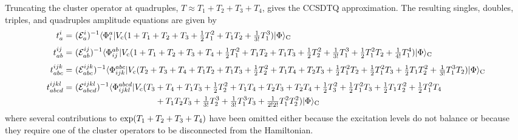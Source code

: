 \documentclass[11pt]{article}
\numberwithin{equation}{section}
\begin{document}
\begin{ex}
Truncating the cluster operator at quadruples, $T\approx T_1 + T_2 + T_3 + T_4$, gives the CCSDTQ approximation.
The resulting singles, doubles, triples, and quadruples amplitude equations are given by\begin{align}
\nonumber
  t_a^i
=&\
  (\mc{E}_a^i)^{-1}
  \ip{\F_i^a|
    V_\mr{c}
    (
      1
    +
      T_1
    +
      T_2
    +
      T_3
    +
      \tfr{1}{2}
      T_1^2
    +
      T_1T_2
    +
      \tfr{1}{3!}
      T_1^3
    )
  |\F}_\mr{C}
\\[3pt]
\nonumber
  t_{ab}^{ij}
=&\
  (\mc{E}_{ab}^{ij})^{-1}
  \br{\F_{ij}^{ab}}
    V_\mr{c}
    (
      1
    +
      T_1
    +
      T_2
    +
      T_3
    +
      T_4
    +
      \tfr{1}{2}
      T_1^2
    +
      T_1T_2
    +
      T_1T_3
    +
      \tfr{1}{2}
      T_2^2
    +
      \tfr{1}{3!}
      T_1^3
    +
      \tfr{1}{2}
      T_1^2T_2
    +
      \tfr{1}{4!}
      T_1^4
    )
  \kt{\F}_\mr{C}
\\[3pt]
\nonumber
  t_{abc}^{ijk}
=&\
  (\mc{E}_{abc}^{ijk})^{-1}
  \br{\F_{ijk}^{abc}}
    V_\mr{c}
    (
      T_2
    +
      T_3
    +
      T_4
    +
      T_1T_2
    +
      T_1T_3
    +
      \tfr{1}{2}
      T_2^2
    +
      T_1T_4
    +
      T_2T_3
    +
      \tfr{1}{2}
      T_1^2T_2
    +
      \tfr{1}{2}
      T_1^2T_3
    +
      \tfr{1}{2}
      T_1T_2^2
    +
      \tfr{1}{3!}
      T_1^3T_2
    )
  \kt{\F}_\mr{C}
\\[3pt]
\nonumber
  t_{abcd}^{ijkl}
=&\
  (\mc{E}_{abcd}^{ijkl})^{-1}
  \br{\F_{ijkl}^{abcd}}
    V_\mr{c}
    (
      T_3
    +
      T_4
    +
      T_1T_3
    +
      \tfr{1}{2}
      T_2^2
    +
      T_1T_4
    +
      T_2T_3
    +
      T_2T_4
    +
      \tfr{1}{2}
      T_3^2
    +
      \tfr{1}{2}
      T_1^2T_3
    +
      \tfr{1}{2}
      T_1T_2^2
    +
      \tfr{1}{2}
      T_1^2T_4
\\
\nonumber
&
\hphantom{
  (\mc{E}_{abcd}^{ijkl})^{-1}
  \br{\F_{ijkl}^{abcd}}
    V_\mr{c}
    (
      T_3\
 }
    +
      T_1T_2T_3
    +
      \tfr{1}{3!}
      T_2^3
    +
      \tfr{1}{3!}
      T_1^3T_3
    +
      \tfr{1}{2!2!}
      T_1^2T_2^2
    )
  \kt{\F}_\mr{C}
\end{align}
where several contributions to $\mathrm{exp}(T_1+T_2+T_3+T_4)$ have been omitted either because the excitation levels do not balance or because they require one of the cluster operators to be disconnected from the Hamiltonian.
\end{ex}
\end{document}
